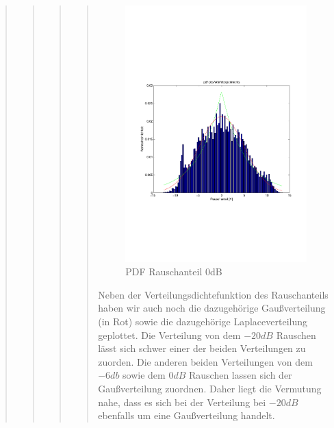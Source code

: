 \begin{quote}
\begin{quote}
\begin{quote}
\begin{quote}
        \begin{figure}[H]
        \centering
            \includegraphics[scale=0.6, trim = 1cm 6.5cm 1cm 7.5cm, clip]{./Bilder/PDFRauschen0dB}
                \caption{PDF Rauschanteil 0dB}
        \end{figure}
        
        
        Neben der Verteilungsdichtefunktion des Rauschanteils haben wir auch noch die dazugehörige Gaußverteilung (in
        Rot) sowie die dazugehörige Laplaceverteilung geplottet. Die Verteilung von dem $-20dB$ Rauschen lässt sich
        schwer einer der beiden Verteilungen zu zuorden. Die anderen beiden Verteilungen von dem $-6db$ sowie dem $0dB$
        Rauschen lassen sich der Gaußverteilung zuordnen. Daher liegt die Vermutung nahe, dass es sich bei der
        Verteilung bei $-20dB$ ebenfalls um eine Gaußverteilung handelt. \vspace{1em}
        

\end{quote}
\end{quote}
\end{quote}
\end{quote}
